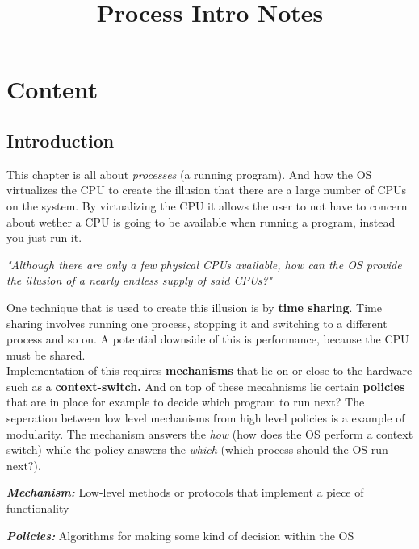 \documentclass[12pt]{article}
\title{\textbf{Process Intro Notes}}
\date{}
\begin{document}
\maketitle
\vspace{-8em}
\section{Content}

\subsection{Introduction}

This chapter is all about \textit{processes} (a running program). And how the OS virtualizes the CPU to create the illusion that there are a large number of CPUs on the system.
By virtualizing the CPU it allows the user to not have to concern about wether a CPU is going to be available when running a program, instead you just run it.\\


\begin{questionbox}[title=Question]
  \textit{"Although there are only a few physical CPUs available, how can the OS provide the illusion of a nearly endless supply of said CPUs?"}
\end{questionbox}


One technique that is used to create this illusion is by \textbf{time sharing}. 
Time sharing involves running one process, stopping it and switching to a different process and so on. 
A potential downside of this is performance, because the CPU must be shared.\\

Implementation of this requires \textbf{mechanisms} that lie on or close to the hardware such as a \textbf{context-switch.} And on top of these mecahnisms lie certain \textbf{policies} that are in place for example to decide which program to run next?
The seperation between low level mechanisms from high level policies is a example of modularity.
The mechanism answers the \textit{how} (how does the OS perform a context switch) while the policy answers the \textit{which} (which process should the OS run next?).

\begin{definitionbox}[title= Definition]
  \textbf{\textit{Mechanism:}} Low-level methods or protocols that implement a piece of functionality
\end{definitionbox}


\begin{definitionbox}[title= Definition]
  \textbf{\textit{Policies:}} Algorithms for making some kind of decision within the OS
\end{definitionbox}
\end{document}
